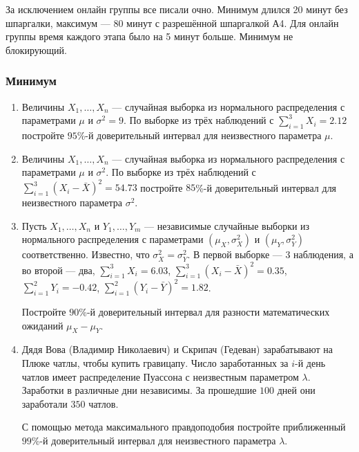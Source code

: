 За исключением онлайн группы все писали очно. Минимум длился 20 минут без шпаргалки, максимум — 80 минут с разрешённой шпаргалкой А4. 
Для онлайн группы время каждого этапа было на 5 минут больше. Минимум не блокирующий. 

\subsubsection*{Минимум}

\begin{enumerate}

	
	\item Величины $X_1, \ldots, X_n$ — случайная выборка из нормального распределения с параметрами $\mu$ и $\sigma^2 = 9$. 
	По выборке из трёх наблюдений с $\sum_{i=1}^3 X_i = 2.12$
	постройте $95$\%-й доверительный интервал для неизвестного параметра $\mu$.
		
	\item Величины $X_1, \ldots, X_n$ — случайная выборка из нормального распределения с параметрами $\mu$ и $\sigma^2$. 
 	По выборке из трёх наблюдений с $\sum_{i=1}^3 (X_i - \bar X )^2 = 54.73$
	постройте $85$\%-й доверительный интервал для неизвестного параметра $\sigma^2$.
	
	\item Пусть $X_1, \dots, X_n$ и $Y_1, \dots, Y_m$ — независимые случайные выборки из нормального распределения с параметрами $(\mu_X, \sigma_X^2)$ и $(\mu_Y, \sigma_Y^2)$ соответственно. 
	Известно, что $\sigma_X^2 = \sigma_Y^2$. В первой выборке — 3 наблюдения, а во второй — два, $\sum_{i=1}^3 X_i = 6.03$, 
	$\sum_{i=1}^3 (X_i - \bar X )^2 = 0.35$, $\sum_{i=1}^2 Y_i = -0.42$, 
	$\sum_{i=1}^2 (Y_i - \bar Y )^2 = 1.82$.
	
	Постройте $90$\%-й доверительный интервал для разности математических ожиданий $\mu_X - \mu_Y$.
		
	\item Дядя Вова (Владимир Николаевич) и Скрипач (Гедеван) зарабатывают на Плюке чатлы, чтобы купить гравицапу. 
	Число заработанных за $i$-й день чатлов имеет распределение Пуассона с неизвестным параметром $\lambda$. 
	Заработки в различные дни независимы. 
	За прошедшие $100$ дней они заработали $350$ чатлов.
	
	С помощью метода максимального правдоподобия постройте приближенный $99$\%-й доверительный интервал для неизвестного параметра $\lambda$.
	
	\end{enumerate}
	

